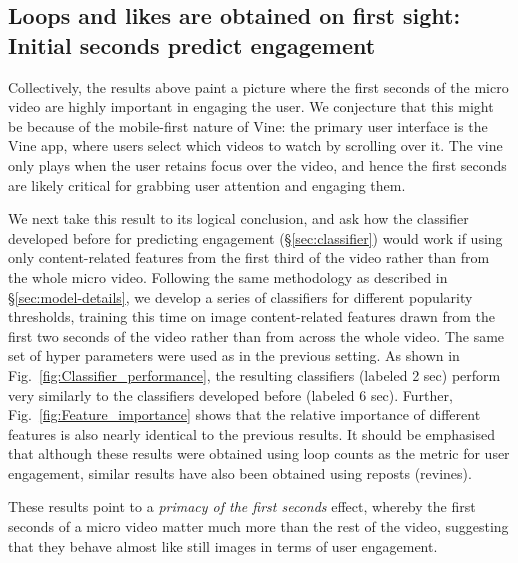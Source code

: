 \subsection{Loops and likes are obtained on first sight: Initial seconds predict engagement}
\label{sec:first-seconds}
Collectively, the results above paint a picture where the first seconds of the micro video are highly important in engaging the user. We conjecture that this might be because of the mobile-first nature of Vine: the primary user interface is the Vine app, where users select which videos to watch by scrolling over it. The vine only plays when the user retains focus over the video, and hence the first seconds are likely critical for grabbing user attention and engaging them. 

We next take this result to its logical conclusion, and ask how the classifier developed before for predicting engagement (\S\ref{sec:classifier}) would work if using only content-related features from the first third of the video rather than from the whole micro video. Following the same methodology as described in \S\ref{sec:model-details}, we develop a series of classifiers for different popularity thresholds, training this time on image content-related features drawn from the first two seconds of the video rather than from across the whole video. The same set of hyper parameters were used as in the previous setting. As shown in Fig.~\ref{fig:Classifier_performance}, the resulting classifiers (labeled 2 sec) perform very similarly to the classifiers developed before (labeled 6 sec). Further, Fig.~\ref{fig:Feature_importance} shows that the relative importance of different features is also nearly identical to the previous results. It should be emphasised that although these results were obtained using loop counts as the metric for user engagement, similar results have also been obtained using reposts (revines). 

These results point to a \emph{primacy of the first seconds} effect, whereby the first seconds of a micro video matter much more than the rest of the video, suggesting that they behave almost like still images in terms of user engagement.







